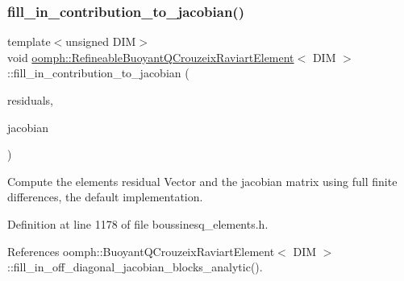 \subsubsection{\texorpdfstring{fill\+\_\+in\+\_\+contribution\+\_\+to\+\_\+jacobian()}{fill\_in\_contribution\_to\_jacobian()}}
{\footnotesize\ttfamily template$<$unsigned D\+IM$>$ \\
void \hyperlink{classoomph_1_1RefineableBuoyantQCrouzeixRaviartElement}{oomph\+::\+Refineable\+Buoyant\+Q\+Crouzeix\+Raviart\+Element}$<$ D\+IM $>$\+::fill\+\_\+in\+\_\+contribution\+\_\+to\+\_\+jacobian (\begin{DoxyParamCaption}\item[{Vector$<$ double $>$ \&}]{residuals,  }\item[{Dense\+Matrix$<$ double $>$ \&}]{jacobian }\end{DoxyParamCaption})\hspace{0.3cm}{\ttfamily [inline]}}



Compute the element\textquotesingle{}s residual Vector and the jacobian matrix using full finite differences, the default implementation. 



Definition at line 1178 of file boussinesq\+\_\+elements.\+h.



References oomph\+::\+Buoyant\+Q\+Crouzeix\+Raviart\+Element$<$ D\+I\+M $>$\+::fill\+\_\+in\+\_\+off\+\_\+diagonal\+\_\+jacobian\+\_\+blocks\+\_\+analytic().

\mbox{\label{classoomph_1_1RefineableBuoyantQCrouzeixRaviartElement_a06f1e2dbdf7a8ebaa964d421aee453ee}} 
